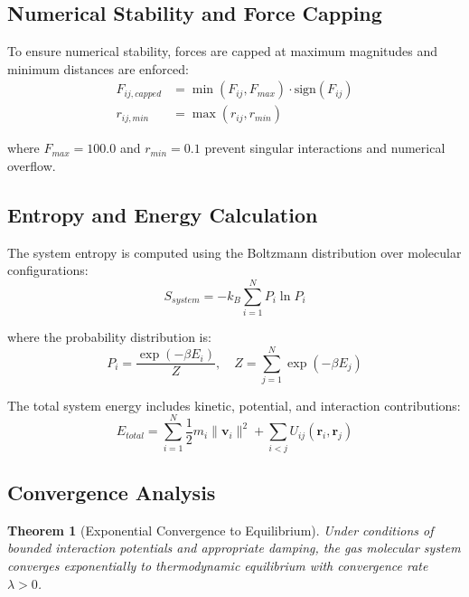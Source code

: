 \documentclass[11pt,a4paper]{article}
\newtheorem{theorem}{Theorem}[section]
\begin{document}
\subsection{Numerical Stability and Force Capping}

To ensure numerical stability, forces are capped at maximum magnitudes and minimum distances are enforced:
\begin{align}
F_{ij,capped} &= \min(F_{ij}, F_{max}) \cdot \text{sign}(F_{ij}) \label{eq:force-capping} \\
r_{ij,min} &= \max(r_{ij}, r_{min}) \label{eq:minimum-distance}
\end{align}

where $F_{max} = 100.0$ and $r_{min} = 0.1$ prevent singular interactions and numerical overflow.

\subsection{Entropy and Energy Calculation}

The system entropy is computed using the Boltzmann distribution over molecular configurations:
\begin{equation}
S_{system} = -k_B \sum_{i=1}^{N} P_i \ln P_i
\label{eq:system-entropy}
\end{equation}

where the probability distribution is:
\begin{equation}
P_i = \frac{\exp(-\beta E_i)}{Z}, \quad Z = \sum_{j=1}^{N} \exp(-\beta E_j)
\label{eq:boltzmann-distribution}
\end{equation}

The total system energy includes kinetic, potential, and interaction contributions:
\begin{equation}
E_{total} = \sum_{i=1}^{N} \frac{1}{2} m_i \|\mathbf{v}_i\|^2 + \sum_{i<j} U_{ij}(\mathbf{r}_i, \mathbf{r}_j)
\label{eq:total-energy}
\end{equation}

\subsection{Convergence Analysis}

\begin{theorem}[Exponential Convergence to Equilibrium]
Under conditions of bounded interaction potentials and appropriate damping, the gas molecular system converges exponentially to thermodynamic equilibrium with convergence rate $\lambda > 0$.
\end{theorem}
\end{document}
